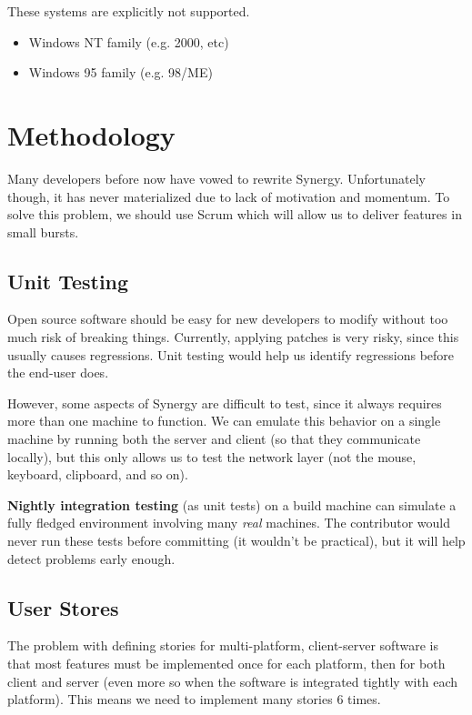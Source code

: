 \documentclass{article}
\begin{document}
These systems are explicitly not supported.

\begin{itemize}
  \item Windows NT family (e.g. 2000, etc)
  \item Windows 95 family (e.g. 98/ME)
\end{itemize}

\section{Methodology}

Many developers before now have vowed to rewrite Synergy. Unfortunately though,
it has never materialized due to lack of motivation and momentum. To solve 
this problem, we should use Scrum which will allow us to deliver features in
small bursts.

\subsection{Unit Testing}

Open source software should be easy for new developers to modify without too
much risk of breaking things. Currently, applying patches is very risky, since 
this usually causes regressions. Unit testing would help us identify regressions
before the end-user does.

However, some aspects of Synergy are difficult to test, since it always requires
more than one machine to function. We can emulate this behavior on a single 
machine by running both the server and client (so that they communicate 
locally), but this only allows us to test the network layer (not the mouse,
keyboard, clipboard, and so on).

\textbf{Nightly integration testing} (as unit tests) on a build machine can 
simulate a fully fledged environment involving many \textit{real} machines. The 
contributor would never run these tests before committing (it wouldn't be 
practical), but it will help detect problems early enough.

\subsection{User Stores}

The problem with defining stories for multi-platform, client-server software
is that most features must be implemented once for each platform, then for both
client and server (even more so when the software is integrated tightly with
each platform). This means we need to implement many stories 6 times.
\end{document}
